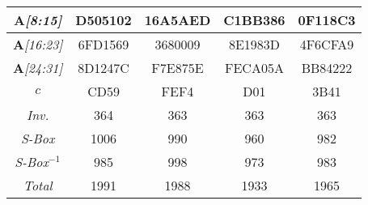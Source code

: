 \begin{sidewaystable}
\begin{center}
\begin{tabular}{|c||c|c|c|c|}
\emph{$\mathbf{A}$[8:15]} &   D505102 &  16A5AED &  C1BB386 &  0F118C3  \\ \hline
\emph{$\mathbf{A}$[16:23]} &   6FD1569 &  3680009 &  8E1983D &  4F6CFA9  \\ \hline
\emph{$\mathbf{A}$[24:31]} &   8D1247C &  F7E875E &  FECA05A &  BB84222  \\ \hline
\emph{$c$} &   CD59 &  FEF4 &  D01 &  3B41  \\ \hline
\emph{Inv.} &   364 &  363 &  363 &  363  \\ \hline
\emph{S-Box} &   1006 &  990 &  960 &  982  \\ \hline
\emph{S-Box$^{-1}$} &   985 &  998 &  973 &  983  \\ \hline
\emph{Total} &   1991 &  1988 &  1933 &  1965  \\ \hline
    \end{tabular}
\end{center}
\end{sidewaystable}

